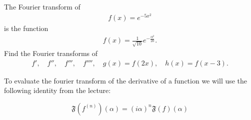 \documentclass[11pt]{article}
\begin{document}

\begin{exercise}
    The Fourier transform of 
    \begin{align*}
        f(x) = e^{-5x^2}
    \end{align*}
    is the function 
    \begin{align*}
        f(x) = \frac{1}{\sqrt{10}} e^{-\frac{\alpha^2}{20}}.
    \end{align*}
    Find the Fourier transforms of 
    \begin{align*}
     f', \quad f'', \quad f''', \quad f'''', \quad g(x) = f(2x), \quad h(x) = f(x-3).
    \end{align*}
\end{exercise}
\begin{solution}  
To evaluate the fourier transform of the derivative of a function we will use the following identity from the lecture:

$$\mathfrak{F}\left(f^{(n)}\right)(\alpha)=(i \alpha)^n \mathfrak{F}(f)(\alpha)$$


\end{solution}
\end{document}
